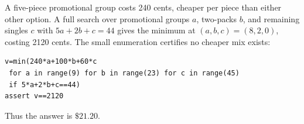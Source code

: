 A five-piece promotional group costs 240 cents, cheaper per piece than either other option. A full search over promotional groups $ a $, two-packs $ b $, and remaining singles $ c $ with $ 5a+2b+c=44 $ gives the minimum at $(a,b,c)=(8,2,0)$, costing 2120 cents. The small enumeration certifies no cheaper mix exists:
\begin{verbatim}
v=min(240*a+100*b+60*c
 for a in range(9) for b in range(23) for c in range(45)
 if 5*a+2*b+c==44)
assert v==2120
\end{verbatim}
Thus the answer is $\boxed{\$ 21.20}$.
